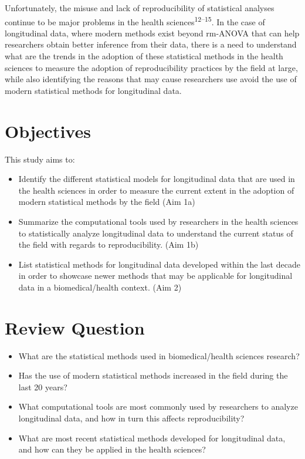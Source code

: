 \documentclass[
]{article}
\begin{document}
Unfortunately, the misuse and lack of reproducibility of statistical
analyses continue to be major problems in the health
sciences\textsuperscript{12--15}. In the case of longitudinal data,
where modern methods exist beyond rm-ANOVA that can help researchers
obtain better inference from their data, there is a need to understand
what are the trends in the adoption of these statistical methods in the
health sciences to measure the adoption of reproducibility practices by
the field at large, while also identifying the reasons that may cause
researchers use avoid the use of modern statistical methods for
longitudinal data.

\hypertarget{objectives}{%
\section{Objectives}\label{objectives}}

This study aims to:

\begin{itemize}
\item
  Identify the different statistical models for longitudinal data that
  are used in the health sciences in order to measure the current extent
  in the adoption of modern statistical methods by the field (Aim 1a)
\item
  Summarize the computational tools used by researchers in the health
  sciences to statistically analyze longitudinal data to understand the
  current status of the field with regards to reproducibility. (Aim 1b)
\item
  List statistical methods for longitudinal data developed within the
  last decade in order to showcase newer methods that may be applicable
  for longitudinal data in a biomedical/health context. (Aim 2)
\end{itemize}

\hypertarget{review-question}{%
\section{Review Question}\label{review-question}}

\begin{itemize}
\item
  What are the statistical methods used in biomedical/health sciences
  research?
\item
  Has the use of modern statistical methods increased in the field
  during the last 20 years?
\item
  What computational tools are most commonly used by researchers to
  analyze longitudinal data, and how in turn this affects
  reproducibility?
\item
  What are most recent statistical methods developed for longitudinal
  data, and how can they be applied in the health sciences?
\end{itemize}
\end{document}
